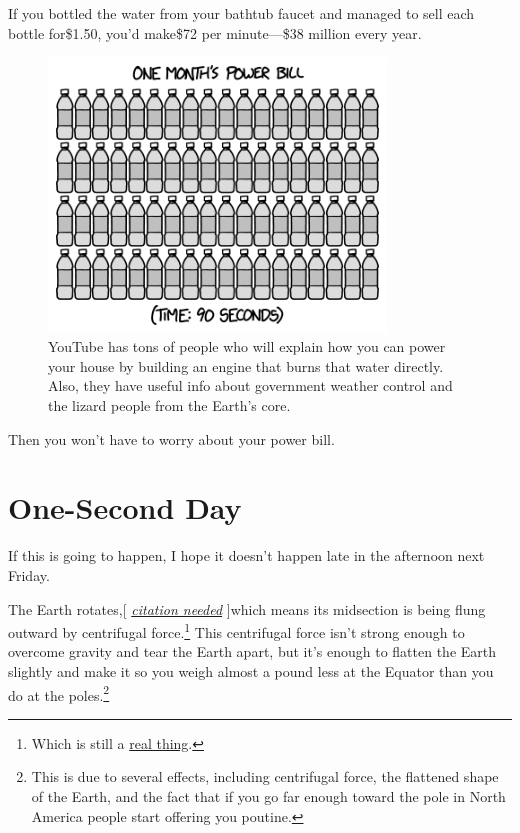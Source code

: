 {{If you bottled the water from your bathtub faucet and managed to sell each bottle for\$1.50, you'd make\$72 per minute—\$38 million every year.}

\begin{figure}[!htbp]
\centering
\includegraphics[scale=0.5, max width=0.8\textwidth]{imgs/a/91/faucet_power.png}
\caption{YouTube has tons of people who will explain how you can power your house by building an engine that burns that water directly. Also, they have useful info about government weather control and the lizard people from the Earth's core.}
\end{figure}

{Then you won't have to worry about your power bill.}

{
\chapter{One-Second Day}
}

\hfill{}

{If this is going to happen, I hope it doesn't happen late in the afternoon next Friday.}

{The Earth rotates,[ \emph{ \href{http://www.timecube.com/}{citation needed}} ]which means its midsection is being flung outward by centrifugal force.{\footnote{Which is still a \href{http://xkcd.com/123/} {real thing}.} } This centrifugal force isn't strong enough to overcome gravity and tear the Earth apart, but it's enough to flatten the Earth slightly and make it so you weigh almost a pound less at the Equator than you do at the poles.{\footnote{This is due to several effects, including centrifugal force, the flattened shape of the Earth, and the fact that if you go far enough toward the pole in North America people start offering you poutine.} } }

}
